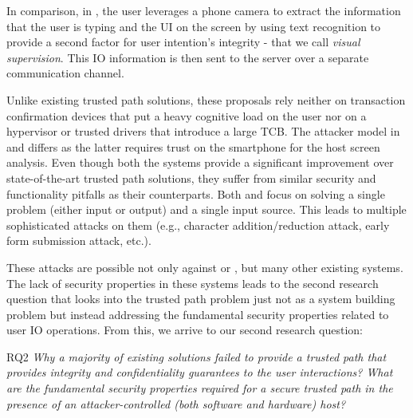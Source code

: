 In comparison, in \integriscreen, the user leverages a phone camera to extract the information that the user is typing and the UI on the screen by using text recognition to provide a second factor for user intention's integrity - that we call \emph{visual supervision}. This IO information is then sent to the server over a separate communication channel. 

Unlike existing trusted path solutions, these proposals rely neither on transaction confirmation devices that put a heavy cognitive load on the user nor on a hypervisor or trusted drivers that introduce a large TCB. The attacker model in \integrikey and \integriscreen differs as the latter requires trust on the smartphone for the host screen analysis. Even though both the systems provide a significant improvement over state-of-the-art trusted path solutions, they suffer from similar security and functionality pitfalls as their counterparts. Both \integrikey and \integriscreen focus on solving a single problem (either input or output) and a single input source. This leads to multiple sophisticated attacks on them (e.g., character addition/reduction attack, early form submission attack, etc.). 

These attacks are possible not only against \integrikey or \integriscreen, but many other existing systems. The lack of security properties in these systems leads to the second research question that looks into the trusted path problem just not as a system building problem but instead addressing the fundamental security properties related to user IO operations. From this, we arrive to our second research question:

\begin{mybox}[colback=white]{RQ2}
\emph{Why a majority of existing solutions failed to provide a trusted path that provides integrity and confidentiality guarantees to the user interactions? What are the fundamental security properties required for a secure trusted path in the presence of an attacker-controlled (both software and hardware) host?}
\end{mybox}

 
    
